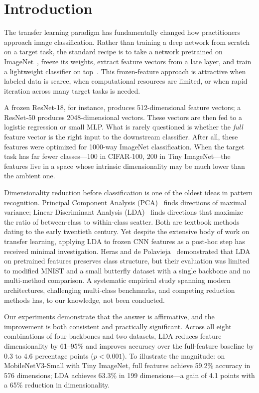 \section{Introduction}
\label{sec:introduction}

The transfer learning paradigm has fundamentally changed how practitioners approach image classification. Rather than training a deep network from scratch on a target task, the standard recipe is to take a network pretrained on ImageNet~\cite{deng2009imagenet}, freeze its weights, extract feature vectors from a late layer, and train a lightweight classifier on top~\cite{donahue2014decaf, sharif2014cnn, kornblith2019better}. This frozen-feature approach is attractive when labeled data is scarce, when computational resources are limited, or when rapid iteration across many target tasks is needed.

A frozen ResNet-18, for instance, produces 512-dimensional feature vectors; a ResNet-50 produces 2048-dimensional vectors. These vectors are then fed to a logistic regression or small MLP. What is rarely questioned is whether the \emph{full} feature vector is the right input to the downstream classifier. After all, these features were optimized for 1000-way ImageNet classification. When the target task has far fewer classes---100 in CIFAR-100, 200 in Tiny ImageNet---the features live in a space whose intrinsic dimensionality may be much lower than the ambient one.

Dimensionality reduction before classification is one of the oldest ideas in pattern recognition. Principal Component Analysis (PCA)~\cite{pearson1901pca, jolliffe2002pca} finds directions of maximal variance; Linear Discriminant Analysis (LDA)~\cite{fisher1936lda, rao1948utilization} finds directions that maximize the ratio of between-class to within-class scatter. Both are textbook methods dating to the early twentieth century. Yet despite the extensive body of work on transfer learning, applying LDA to frozen CNN features as a post-hoc step has received minimal investigation. Heras and de Polavieja~\cite{heras2020lda_cnn} demonstrated that LDA on pretrained features preserves class structure, but their evaluation was limited to modified MNIST and a small butterfly dataset with a single backbone and no multi-method comparison. A systematic empirical study spanning modern architectures, challenging multi-class benchmarks, and competing reduction methods has, to our knowledge, not been conducted.

Our experiments demonstrate that the answer is affirmative, and the improvement is both consistent and practically significant. Across all eight combinations of four backbones and two datasets, LDA reduces feature dimensionality by 61--95\% and improves accuracy over the full-feature baseline by 0.3 to 4.6 percentage points ($p < 0.001$). To illustrate the magnitude: on MobileNetV3-Small with Tiny ImageNet, full features achieve 59.2\% accuracy in 576 dimensions; LDA achieves 63.3\% in 199 dimensions---a gain of 4.1 points with a 65\% reduction in dimensionality.

